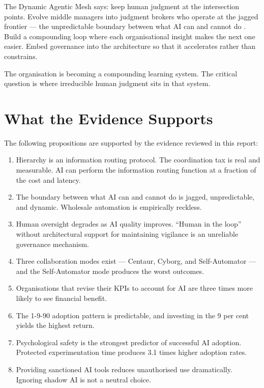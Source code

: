 The Dynamic Agentic Mesh says: keep human judgment at the intersection points. Evolve middle managers into judgment brokers who operate at the jagged frontier --- the unpredictable boundary between what AI can and cannot do \parencite{DellAcqua2026}. Build a compounding loop where each organisational insight makes the next one easier. Embed governance into the architecture so that it accelerates rather than constrains.

The organisation is becoming a compounding learning system. The critical question is where irreducible human judgment sits in that system.

\section{What the Evidence Supports}

The following propositions are supported by the evidence reviewed in this report:

\begin{enumerate}
  \item Hierarchy is an information routing protocol. The coordination tax is real and measurable. AI can perform the information routing function at a fraction of the cost and latency.
  \item The boundary between what AI can and cannot do is jagged, unpredictable, and dynamic. Wholesale automation is empirically reckless.
  \item Human oversight degrades as AI quality improves. ``Human in the loop'' without architectural support for maintaining vigilance is an unreliable governance mechanism.
  \item Three collaboration modes exist --- Centaur, Cyborg, and Self-Automator --- and the Self-Automator mode produces the worst outcomes.
  \item Organisations that revise their KPIs to account for AI are three times more likely to see financial benefit.
  \item The 1-9-90 adoption pattern is predictable, and investing in the 9 per cent yields the highest return.
  \item Psychological safety is the strongest predictor of successful AI adoption. Protected experimentation time produces 3.1 times higher adoption rates.
  \item Providing sanctioned AI tools reduces unauthorised use dramatically. Ignoring shadow AI is not a neutral choice.
\end{enumerate}

